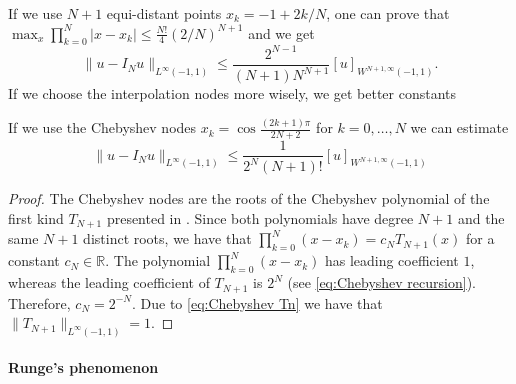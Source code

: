 If we use $N+1$ equi-distant points $x_k = -1 + 2k/N$, one can prove that $\max_{x} \prod_{k=0}^N |x - x_k| \le \frac{N!}{4} (2/N)^{N+1}$ and we get
\begin{equation*}
    \| u - I_N u \|_{L^\infty(-1,1)} \le \frac{2^{N-1}}{(N+1) N^{N+1}} [u]_{W^{N+1,\infty}(-1,1)}.
\end{equation*}
If we choose the interpolation nodes more wisely, we get better constants
\begin{theorem}
    If we use the Chebyshev nodes $x_k = \cos \frac{(2k+1) \pi}{2N+2}$ for $k=0, \dots, N$ we can estimate
    \begin{equation}
        \label{eq:interpolation error Chebyshev nodes}
        \| u - I_N u \|_{L^\infty(-1,1)} \le \frac{1}{2^N (N+1)!} [u]_{W^{N+1,\infty}(-1,1)}
    \end{equation}
\end{theorem}
\begin{proof}
    The Chebyshev nodes are the roots of the Chebyshev polynomial of the first kind $T_{N+1}$ presented in .
    Since both polynomials have degree $N+1$ and the same $N+1$ distinct roots, we have that $\prod_{k=0}^N (x-x_k) = c_N T_{N+1}(x)$ for a constant $c_N \in \mathbb R$.
    The polynomial $\prod_{k=0}^N (x-x_k)$ has leading coefficient $1$, whereas the leading coefficient of $T_{N+1}$ is $2^N$ (see \eqref{eq:Chebyshev recursion}). Therefore, $c_N = 2^{-N}$. Due to \eqref{eq:Chebyshev Tn} we have that $\|T_{N+1}\|_{L^\infty(-1,1)} = 1$.
\end{proof}



\paragraph{Runge's phenomenon}
\label{sec:Runge's phenomenon}

